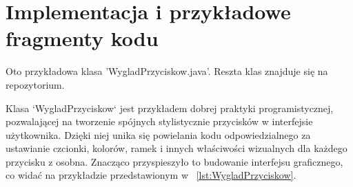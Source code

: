 \chapter{Implementacja i przykładowe fragmenty kodu}
Oto przykładowa klasa 'WygladPrzyciskow.java'. Reszta klas znajduje się na repozytorium.


\begin{minipage}{\linewidth}
Klasa `WygladPrzyciskow` jest przykładem dobrej praktyki programistycznej, pozwalającej na tworzenie spójnych stylistycznie przycisków w interfejsie użytkownika. Dzięki niej unika się powielania kodu odpowiedzialnego za ustawianie czcionki, kolorów, ramek i innych właściwości wizualnych dla każdego przycisku z osobna. Znacząco przyspieszyło to budowanie interfejsu graficznego, co widać na przykładzie przedstawionym w \listingname~\ref{lst:WygladPrzyciskow}.


\end{minipage}

\clearpage


